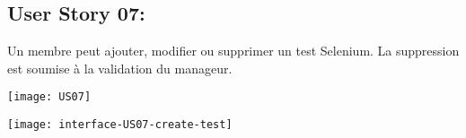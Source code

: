 \newpage{}
\subsection{User Story 07:}
Un membre peut ajouter, modifier ou supprimer un test Selenium. La suppression est soumise à la validation
du manageur.


  \begin{center}
        \texttt{[image: US07]}
  \end{center}

\newpage{}
  \begin{center}
        \texttt{[image: interface-US07-create-test]}
  \end{center}